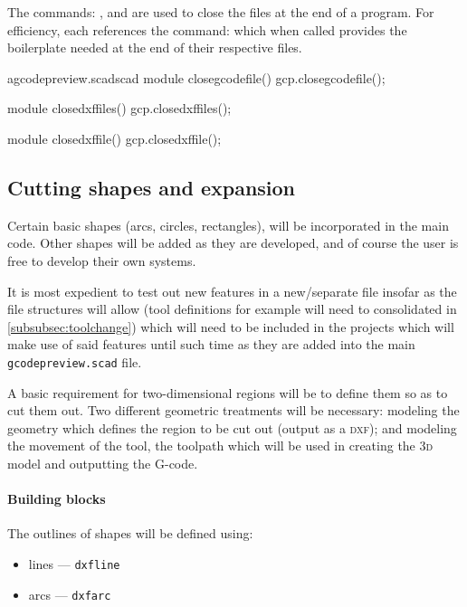 \documentclass{ltxdoc}
\begin{document}
The commands: , and  are used to close the files at the end of a program. For efficiency, each references the command:  which when called provides the boilerplate needed at the end of their respective files.

\lstset{firstnumber=\thegcpscad}
\begin{writecode}{a}{gcodepreview.scad}{scad}
module closegcodefile(){
    gcp.closegcodefile();
}

module closedxffiles(){
    gcp.closedxffiles();
}

module closedxffile(){
    gcp.closedxffile();
}

\end{writecode}
\addtocounter{gcpscad}{12}


\subsection{Cutting shapes and expansion}

Certain basic shapes (arcs, circles, rectangles), will be incorporated in the main code. Other shapes will be added as they are developed, and of course the user is free to develop their own systems.

 
It is most expedient to test out new features in a new/separate file insofar as the file structures will allow (tool definitions for example will need to consolidated in \ref{subsubsec:toolchange}) which will need to be included in the projects which will make use of said features until such time as they are added into the main \texttt{gcodepreview.scad} file.

A basic requirement for two-dimensional regions will be to define them so as to cut them out. Two different geometric treatments will be necessary: modeling the geometry which defines the region to be cut out (output as a \textsc{dxf}); and modeling the movement of the tool, the toolpath which will be used in creating the \textsc{3d} model and outputting the G-code.

\paragraph{Building blocks}

The outlines of shapes will be defined using:

\begin{itemize}
\item lines --- \verb|dxfline|
\item arcs --- \verb|dxfarc|
\end{itemize}
\end{document}
